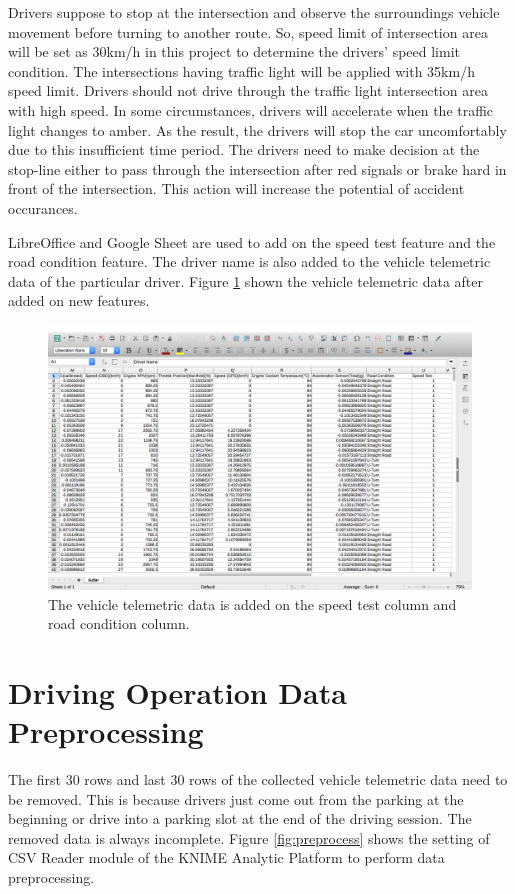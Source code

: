 Drivers suppose to stop at the intersection and observe the surroundings vehicle movement before turning to another route. So, speed limit of intersection area will be set as 30km/h in this project to determine the drivers' speed limit condition. The intersections having traffic light will be applied with 35km/h speed limit. Drivers should not drive through the traffic light intersection area with high speed. In some circumstances, drivers will accelerate when the traffic light changes to amber. As the result, the drivers will stop the car uncomfortably due to this insufficient time period. The drivers need to make decision at the stop-line either to pass through the intersection after red signals or brake hard in front of the intersection. This action will increase the potential of accident occurances.\cite{kulanthayan:phang:hayati:2007}

LibreOffice and Google Sheet are used to add on the speed test feature and the road condition feature. The driver name is also added to the vehicle telemetric data of the particular driver. Figure \ref{fig:speedtest} shown the vehicle telemetric data after added on new features.

\begin{figure}[hbt!]\centering
\includegraphics[width=.75\textwidth]{image/LOspeedtest}
\caption{The vehicle telemetric data is added on the speed test column and road condition column.}
\label{fig:speedtest}
\end{figure}


\section{Driving Operation Data Preprocessing}
The first 30 rows and last 30 rows of the collected vehicle telemetric data need to be removed. This is because drivers just come out from the parking at the beginning or drive into a parking slot at the end of the driving session. The removed data is always incomplete. Figure \ref{fig:preprocess} shows the setting of CSV Reader module of the KNIME Analytic Platform to perform data preprocessing.

